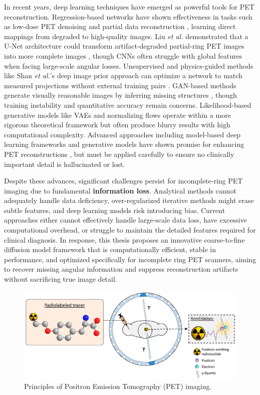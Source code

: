 \documentclass[
reprint,
superscriptaddress,
nofootinbib,
amsmath,amssymb,
aps,
prd,
]{revtex4-2}
\begin{document}
In recent years, deep learning techniques have emerged as powerful tools for PET reconstruction. Regression-based networks have shown effectiveness in tasks such as low-dose PET denoising and partial data reconstruction  \cite{Kandarpa_2021}, learning direct mappings from degraded to high-quality images. Liu \textit{et al.} demonstrated that a U-Net architecture could transform artifact-degraded partial-ring PET images into more complete images  \cite{liu2019}, though CNNs often struggle with global features when facing large-scale angular losses. 
Unsupervised and physics-guided methods like Shan \textit{et al.}'s deep image prior approach can optimize a network to match measured projections without external training pairs  \cite{shan2024}. GAN-based methods generate visually reasonable images by inferring missing structures  \cite{xue2023cg3dsrganclassificationguided3d}, though training instability and quantitative accuracy remain concerns. Likelihood-based generative models like VAEs and normalizing flows operate within a more rigorous theoretical framework but often produce blurry results with high computational complexity. Advanced approaches including model-based deep learning frameworks and generative models have shown promise for enhancing PET reconstructions  \cite{reader2023, vashistha2024}, but must be applied carefully to ensure no clinically important detail is hallucinated or lost.

Despite these advances, significant challenges persist for incomplete-ring PET imaging due to fundamental \textbf{information loss}. Analytical methods cannot adequately handle data deficiency, over-regularized iterative methods might erase subtle features, and deep learning models risk introducing bias. Current approaches either cannot effectively handle large-scale data loss, have excessive computational overhead, or struggle to maintain the detailed features required for clinical diagnosis. In response, this thesis proposes an innovative coarse-to-fine diffusion model framework that is computationally efficient, stable in performance, and optimized specifically for incomplete ring PET scanners, aiming to recover missing angular information and suppress reconstruction artifacts without sacrificing true image detail.



\begin{figure}[htbp]
	\centering
	\includegraphics[scale=0.47]{./Images/graph.jpg}
	\caption{Principles of Positron Emission Tomography (PET) imaging.}
	\label{fig:graph}
\end{figure}
\end{document}
